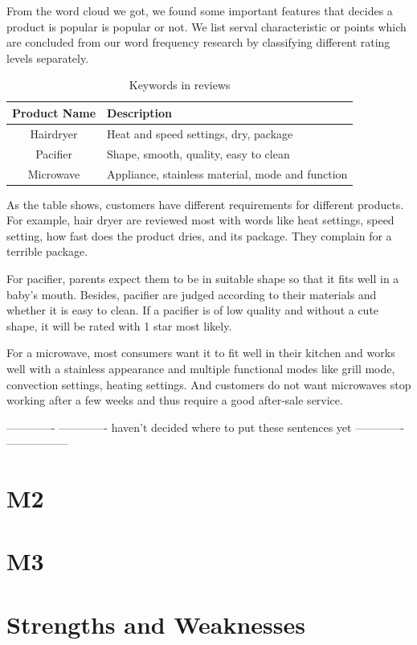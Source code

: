 \documentclass{mcmthesis}
\begin{document}
From the word cloud we got, we found some important features that decides a product is popular is popular or not.
We list serval characteristic or points which are concluded from our word frequency research by classifying different rating levels separately.\par
\begin{table}[htbp]
\centering
\caption{Keywords in reviews}
\begin{tabular}{cp{}}
\toprule
 Product Name & Description\\
\midrule
Hairdryer &Heat and speed settings, dry, package\\
Pacifier & Shape, smooth, quality, easy to clean\\
Microwave & Appliance, stainless material, mode and function\\
\bottomrule
\end{tabular}
\end{table}
As the table shows, customers have different requirements for different products. For example, hair dryer are reviewed most with words like heat settings, speed setting, how fast does the product dries, and its package. They complain for a terrible package.\par
For pacifier, parents expect them to be in suitable shape so that it fits well in a baby’s mouth. Besides, pacifier are judged according to their materials and whether it is easy to clean. If a pacifier is of low quality and without a cute shape, it will be rated with 1 star most likely.\par
For a microwave, most consumers want it to fit well in their kitchen and works well with a stainless appearance and multiple functional modes like grill mode, convection settings, heating settings.
And customers do not want microwaves stop working after a few weeks and thus require a good after-sale service.


------------- -------------  haven't decided where to put these sentences yet -------------  -----------------


\section{M2}

\section{M3}




\section{Strengths and Weaknesses}
\end{document}
